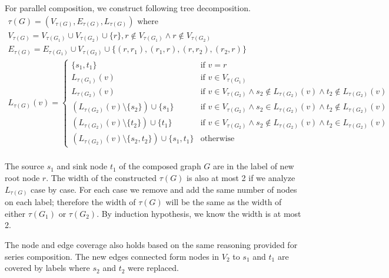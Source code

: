 \documentclass[10pt]{homework}
\begin{document}
\begin{induction}
For parallel composition, we construct following tree decomposition.
\[
\begin{array}{l}
\tau(G) = (V_{\tau(G)}, E_{\tau(G)}, L_{\tau(G)}) \text{ where}                                                \\
V_{\tau(G)} = V_{\tau(G_1)} \cup V_{\tau(G_2)} \cup \{r\}, r \notin V_{\tau(G_1)} \land r \notin V_{\tau(G_2)} \\
E_{\tau(G)} = E_{\tau(G_1)} \cup V_{\tau(G_2)} \cup \{(r, r_1), (r_1, r), (r, r_2), (r_2, r)\}                 \\
L_{\tau(G)}(v) = \left\{
\begin{array}{ll}
	\{s_1, t_1\}                                      & \text{if } v = r                                                \\
	L_{\tau(G_1)}(v)                                  & \text{if } v \in V_{\tau(G_1)}                                   \\
	L_{\tau(G_2)}(v)                                  & \text{if } v \in V_{\tau(G_2)} \land s_2 \notin L_{\tau(G_2)}(v) \land t_2 \notin L_{\tau(G_2)}(v)\\
	(L_{\tau(G_2)}(v) \setminus \{s_2\}) \cup \{s_1\} & \text{if } v \in V_{\tau(G_2)} \land s_2 \in    L_{\tau(G_2)}(v) \land t_2 \notin L_{\tau(G_2)}(v)\\
	(L_{\tau(G_2)}(v) \setminus \{t_2\}) \cup \{t_1\} & \text{if } v \in V_{\tau(G_2)} \land s_2 \notin L_{\tau(G_2)}(v) \land t_2 \in    L_{\tau(G_2)}(v)\\
    (L_{\tau(G_2)}(v) \setminus \{s_2, t_2\}) \cup \{s_1, t_1\} & \text{otherwise}
\end{array}\right.  \\
\end{array}
\]

The source \(s_1\) and sink node \(t_1\) of the composed graph \(G\) are in the
label of new root node \(r\).
The width of the constructed \(\tau(G)\) is also at most 2 if we analyze
\(L_{\tau(G)}\) case by case.
For each case we remove and add the same number of nodes on each label;
therefore the width of \(\tau(G)\) will be the same as the width of either
\(\tau(G_1)\) or \(\tau(G_2)\).
By induction hypothesis, we know the width is at most 2.

The node and edge coverage also holds based on the same reasoning provided for
series composition.
The new edges connected form nodes in \(V_2\) to \(s_1\) and \(t_1\) are covered
by labels where \(s_2\) and \(t_2\) were replaced.


\end{induction}
\end{document}
